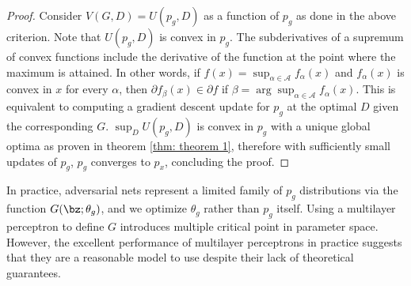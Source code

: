 \begin{proof}
	Consider $V(G,D)=U(p_g,D)$ as a function of $p_g$ as done in the above criterion. Note that $U(p_g,D)$ is convex in $p_g$. The subderivatives of a supremum of  convex functions include the derivative of the function at the point where the maximum is attained. In other words, if $f(x)=\sup_{\alpha\in\mathcal{A}}f_{\alpha}(x)$ and $f_{\alpha}(x)$ is convex in $x$ for every $\alpha$, then $\partial f_{\beta}(x)\in\partial f$ if $\beta=\arg\sup_{\alpha\in\mathcal{A}}f_{\alpha}(x)$. This is equivalent to computing a gradient descent update for $p_g$ at the optimal $D$ given the corresponding $G$. $\sup_DU(p_g, D)$ is convex in $p_g$ with a unique global optima as proven in theorem \ref{thm: theorem 1}, therefore with sufficiently small updates of $p_g$, $p_g$ converges to $p_x$, concluding the proof.
\end{proof}

\noindent In practice, adversarial nets represent a limited family of $p_g$ distributions via the function $G(\bz; \theta_g)$, and we optimize $\theta_g$ rather than $p_g$ itself. Using a multilayer perceptron to define $G$ introduces multiple critical point in parameter space. However, the excellent performance of multilayer perceptrons in practice suggests that they are a reasonable model to use despite their lack of theoretical guarantees.